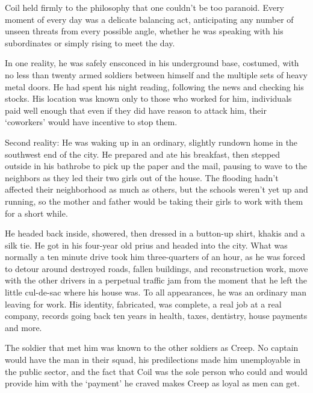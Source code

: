 





Coil held firmly to the philosophy that one couldn't be too paranoid.  Every moment of every day was a delicate balancing act, anticipating any number of unseen threats from every possible angle, whether he was speaking with his subordinates or simply rising to meet the day.



In one reality, he was safely ensconced in his underground base, costumed, with no less than twenty armed soldiers between himself and the multiple sets of heavy metal doors.   He had spent his night reading, following the news and checking his stocks.  His location was known only to those who worked for him, individuals paid well enough that even if they did have reason to attack him, their `coworkers' would have incentive to stop them.



Second reality:  He was waking up in an ordinary, slightly rundown home in the southwest end of the city.  He prepared and ate his breakfast, then stepped outside in his bathrobe to pick up the paper and the mail, pausing to wave to the neighbors as they led their two girls out of the house.  The flooding hadn't affected their neighborhood as much as others, but the schools weren't yet up and running, so the mother and father would be taking their girls to work with them for a short while.



He headed back inside, showered, then dressed in a button-up shirt, khakis and a silk tie.  He got in his four-year old prius and headed into the city.  What was normally a ten minute drive took him three-quarters of an hour, as he was forced to detour around destroyed roads, fallen buildings, and reconstruction work, move with the other drivers in a perpetual traffic jam from the moment that he left the little cul-de-sac where his house was.  To all appearances, he was an ordinary man leaving for work.  His identity, fabricated, was complete, a real job at a real company, records going back ten years in health, taxes, dentistry, house payments and more.



The soldier that met him was known to the other soldiers as Creep.  No captain would have the man in their squad, his predilections made him unemployable in the public sector, and the fact that Coil was the sole person who could and would provide him with the `payment' he craved makes Creep as loyal as men can get.



